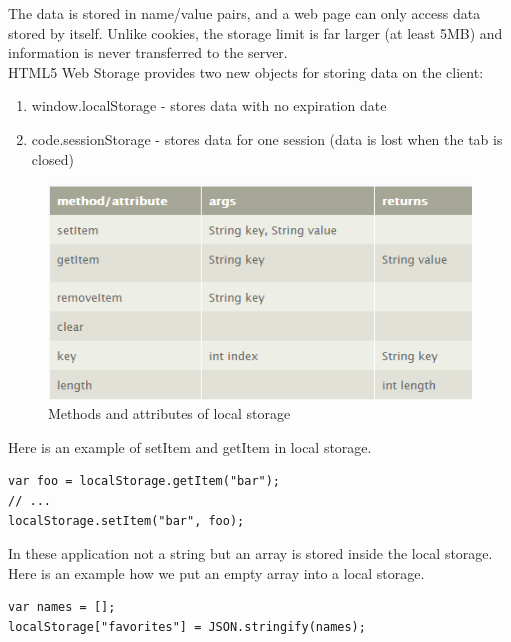 The data is stored in name/value pairs, and a web page can only access data stored by itself. Unlike cookies, the storage limit is far larger (at least 5MB) and information is never transferred to the server.\cite{w3school}
\\

HTML5 Web Storage provides two new objects for storing data on the client:
\begin{enumerate}
\item window.localStorage - stores data with no expiration date\cite{w3school}
\item code.sessionStorage - stores data for one session (data is lost when the tab is closed)\cite{w3school}
\end{enumerate}
\newpage

\begin{figure}[t]
\centering
\includegraphics[width=0.9\linewidth]{graphics/chapter4/20}
\caption{Methods and attributes of local storage\cite{localstorageapi}}
\label{fig:4}
\end{figure}


Here is an example of setItem and getItem in local storage.
\\

\begin{lstlisting}[language=html, caption= 
setItem example (Adapted from \cite{localstorageexample}),captionpos=b]
var foo = localStorage.getItem("bar");
// ...
localStorage.setItem("bar", foo);
\end{lstlisting}

In these application not a string but an array is stored inside the local storage. Here is an example how we put an empty array into a local storage.
\\

\begin{lstlisting}[language=html, caption= 
array into local storage,captionpos=b]
var names = [];
localStorage["favorites"] = JSON.stringify(names);
\end{lstlisting}

